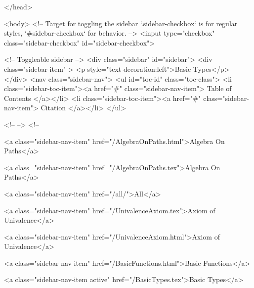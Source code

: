   
</head>




  <body>
    <!-- Target for toggling the sidebar `.sidebar-checkbox` is for regular
     styles, `#sidebar-checkbox` for behavior. -->
<input type="checkbox" class="sidebar-checkbox" id="sidebar-checkbox">

<!-- Toggleable sidebar -->
<div class="sidebar" id="sidebar">
  <div class="sidebar-item" >
    <p style="text-decoration:left">Basic Types</p>
  </div>
  <nav class="sidebar-nav">
    <ul id="toc-id" class="toc-class">
  <li class="sidebar-toc-item"><a href="#" class="sidebar-nav-item"> Table of Contents </a></li>
  <li class="sidebar-toc-item"><a href="#" class="sidebar-nav-item"> Citation </a></li>
</ul>


    <!--  -->
    <!-- 
      
    
      
    
      
    
      
        
      
    
      
        
          <a class="sidebar-nav-item" href="/AlgebraOnPaths.html">Algebra On Paths</a>
        
      
    
      
        
          <a class="sidebar-nav-item" href="/AlgebraOnPaths.tex">Algebra On Paths</a>
        
      
    
      
        
          <a class="sidebar-nav-item" href="/all/">All</a>
        
      
    
      
        
          <a class="sidebar-nav-item" href="/UnivalenceAxiom.tex">Axiom of Univalence</a>
        
      
    
      
        
          <a class="sidebar-nav-item" href="/UnivalenceAxiom.html">Axiom of Univalence</a>
        
      
    
      
        
          <a class="sidebar-nav-item" href="/BasicFunctions.html">Basic Functions</a>
        
      
    
      
        
          <a class="sidebar-nav-item active" href="/BasicTypes.tex">Basic Types</a>
        
